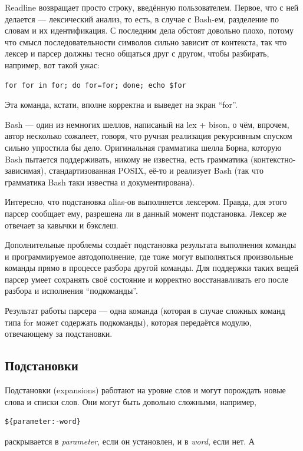 \documentclass[a5paper]{article}
\begin{document}
Readline возвращает просто строку, введённую пользователем. Первое, что с ней делается --- лексический анализ, то есть, в случае с Bash-ем, разделение по словам и их идентификация. С последним дела обстоят довольно плохо, потому что смысл последовательности символов сильно зависит от контекста, так что лексер и парсер должны тесно общаться друг с другом, чтобы разбирать, например, вот такой ужас:

\begin{verbatim}
for for in for; do for=for; done; echo $for
\end{verbatim}

Эта команда, кстати, вполне корректна и выведет на экран ``for''.

Bash --- один из немногих шеллов, написаный на lex + bison, о чём, впрочем, автор несколько сожалеет, говоря, что ручная реализация рекурсивным спуском сильно упростила бы дело. Оригинальная грамматика шелла Борна, которую Bash пытается поддерживать, никому не известна, есть грамматика (контекстно-зависимая), стандартизованная POSIX, её-то и реализует Bash (так что грамматика Bash таки известна и документирована).

Интересно, что подстановка alias-ов выполняется лексером. Правда, для этого парсер сообщает ему, разрешена ли в данный момент подстановка. Лексер же отвечает за кавычки и бэкслеш.

Дополнительные проблемы создаёт подстановка результата выполнения команды и программируемое автодополнение, где тоже могут выполняться произвольные команды прямо в процессе разбора другой команды. Для поддержки таких вещей парсер умеет сохранять своё состояние и корректно восстанавливать его после разбора и исполнения ``подкоманды''.

Результат работы парсера --- одна команда (которая в случае сложных команд типа for может содержать подкоманды), которая передаётся модулю, отвечающему за подстановки.

\subsection{Подстановки}

Подстановки (expansions) работают на уровне слов и могут порождать новые слова и списки слов. Они могут быть довольно сложными, например,

\begin{verbatim}
${parameter:-word}
\end{verbatim}

раскрывается в \textit{parameter}, если он установлен, и в \textit{word}, если нет. А
\end{document}
